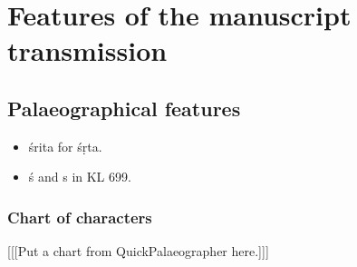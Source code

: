 
\section{Features of the manuscript transmission}

\subsection{Palaeographical features}
\begin{itemize}
    \item śrita for śṛta.
    \item ś and s in KL 699.
\end{itemize}

\subsubsection{Chart of characters}

[[[Put a chart from QuickPalaeographer here.]]]

\newpage

